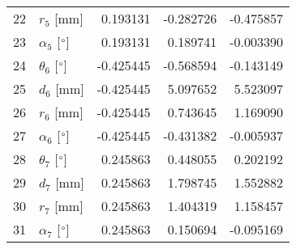 \documentclass{standalone}%
\begin{document}
\begin{tabular}{llrrr}
22 &              $r_{5}$ [mm] &  0.193131 &  -0.282726 &  -0.475857 \\
23 &  $\alpha_{5}$ [$\degree$] &  0.193131 &   0.189741 &  -0.003390 \\
24 &  $\theta_{6}$ [$\degree$] & -0.425445 &  -0.568594 &  -0.143149 \\
25 &              $d_{6}$ [mm] & -0.425445 &   5.097652 &   5.523097 \\
26 &              $r_{6}$ [mm] & -0.425445 &   0.743645 &   1.169090 \\
27 &  $\alpha_{6}$ [$\degree$] & -0.425445 &  -0.431382 &  -0.005937 \\
28 &  $\theta_{7}$ [$\degree$] &  0.245863 &   0.448055 &   0.202192 \\
29 &              $d_{7}$ [mm] &  0.245863 &   1.798745 &   1.552882 \\
30 &              $r_{7}$ [mm] &  0.245863 &   1.404319 &   1.158457 \\
31 &  $\alpha_{7}$ [$\degree$] &  0.245863 &   0.150694 &  -0.095169 \\
\bottomrule
\end{tabular}
%
\end{document}
